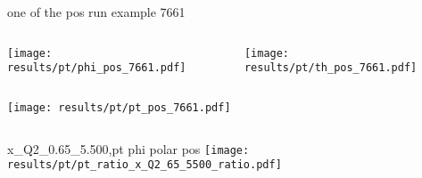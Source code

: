 \begin{frame}{one of the pos run example 7661}
\begin{columns}
\begin{column}[T]{0.5\textwidth}
\texttt{[image: results/pt/phi\_pos\_7661.pdf]}
\end{column}
\begin{column}[T]{0.5\textwidth}
\texttt{[image: results/pt/th\_pos\_7661.pdf]}
\end{column}
\end{columns}
\begin{columns}
\begin{column}[T]{0.5\textwidth}
\texttt{[image: results/pt/pt\_pos\_7661.pdf]}
\end{column}
\begin{column}[T]{0.5\textwidth}
\end{column}
\end{columns}
\end{frame}
\begin{frame}{x\_Q2\_0.65\_5.500,pt phi polar pos}
\texttt{[image: results/pt/pt\_ratio\_x\_Q2\_65\_5500\_ratio.pdf]}
\end{frame}
